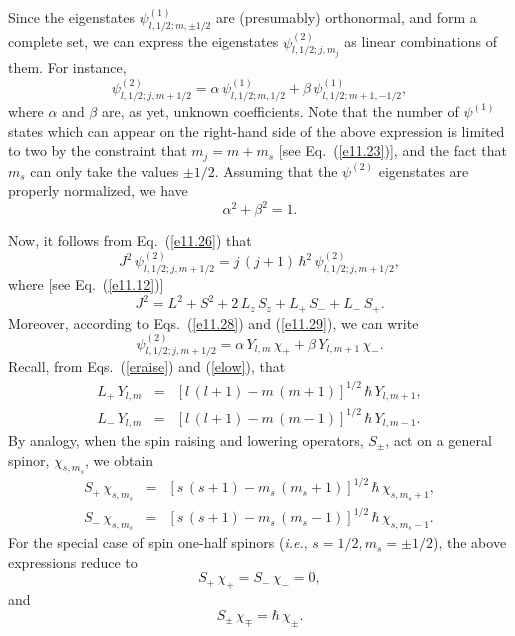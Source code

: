 Since the eigenstates $\psi^{(1)}_{l,1/2;m,\pm 1/2}$ are (presumably)
orthonormal, and form a complete set, we can express the eigenstates $\psi^{(2)}_{l,1/2;j,m_j}$ as  linear combinations of them. For instance,
\begin{equation}\label{e11.29}
\psi^{(2)}_{l,1/2;j,m+1/2} = \alpha\,\psi^{(1)}_{l,1/2;m,1/2} + \beta\,
\psi^{(1)}_{l,1/2;m+1,-1/2},
\end{equation}
where $\alpha$ and $\beta$ are, as yet, unknown coefficients. Note that
the number of $\psi^{(1)}$ states which can appear on the right-hand side
of the above expression is limited to two by the constraint that
$m_j=m+m_s$ [see Eq.~(\ref{e11.23})], and the fact that $m_s$ can only take the values $\pm 1/2$. 
Assuming that the $\psi^{(2)}$ eigenstates are properly normalized, we have
\begin{equation}\label{e11.30}
\alpha^2 + \beta^2 = 1.
\end{equation}

Now, it follows from Eq.~(\ref{e11.26}) that
\begin{equation}\label{e11.31}
J^2\,\psi^{(2)}_{l,1/2;j,m+1/2}= j\,(j+1)\,\hbar^2\,\psi^{(2)}_{l,1/2;j,m+1/2},
\end{equation}
where [see Eq.~(\ref{e11.12})]
\begin{equation}\label{e11.32}
J^2 = L^2+S^2 +2\,L_z\,S_z+ L_+\,S_-+L_-\,S_+.
\end{equation}
Moreover, according to Eqs.~(\ref{e11.28}) and (\ref{e11.29}), we can write
\begin{equation}\label{e11.33}
\psi^{(2)}_{l,1/2;j,m+1/2} = \alpha\,Y_{l,m}\,\chi_+ + \beta\,
Y_{l,m+1}\,\chi_-.
\end{equation}
Recall, from Eqs.~(\ref{eraise}) and (\ref{elow}), that
\begin{eqnarray}\label{e11.34}
L_+\,Y_{l,m} &=& [l\,(l+1)-m\,(m+1)]^{1/2}\,\hbar\,Y_{l,m+1},\\[0.5ex]
L_-\,Y_{l,m} &=& [l\,(l+1)-m\,(m-1)]^{1/2}\,\hbar\,Y_{l,m-1}.
\end{eqnarray}
By analogy, when the  spin raising and lowering operators, $S_\pm$, act on a general spinor, $\chi_{s,m_s}$, we obtain
\begin{eqnarray}
S_+\,\chi_{s,m_s} &=& [s\,(s+1)-m_s\,(m_s+1)]^{1/2}\,\hbar\,\chi_{s,m_s+1},\\[0.5ex]
S_-\,\chi_{s,m_s} &=& [s\,(s+1)-m_s\,(m_s-1)]^{1/2}\,\hbar\,\chi_{s,m_s-1}.
\end{eqnarray}
For the special case of spin one-half spinors ({\em i.e.}, $s=1/2, m_s=\pm 1/2$), the above expressions reduce to
\begin{equation}
S_+\,\chi_+=S_-\,\chi_- = 0,
\end{equation}
and
\begin{equation}\label{e11.39}
S_\pm\,\chi_\mp = \hbar\,\chi_\pm.
\end{equation}

